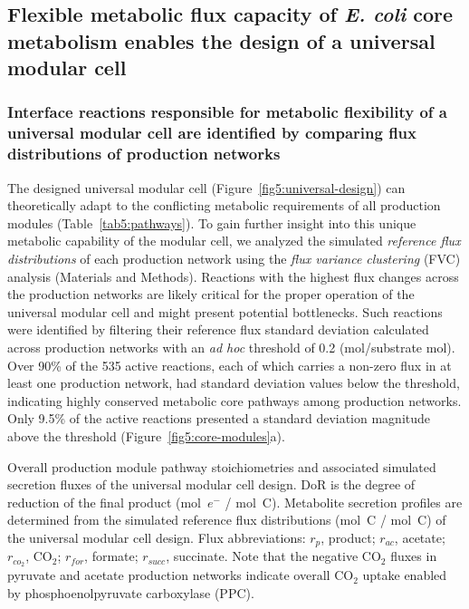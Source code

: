 \subsection{Flexible metabolic flux capacity of \textit{E. coli} core metabolism enables the design of a universal modular cell}

\subsubsection{Interface reactions responsible for metabolic flexibility of a universal modular cell are identified by comparing flux distributions of production networks}
The designed universal modular cell (Figure~\ref{fig5:universal-design}) can theoretically adapt to the conflicting metabolic requirements of all production modules (Table~\ref{tab5:pathways}).
To gain further insight into this unique metabolic capability of the modular cell, we analyzed the simulated \emph{reference flux distributions} of each production network using the \emph{flux variance clustering} (FVC) analysis (Materials and Methods).
Reactions with the highest flux changes across the production networks are likely critical for the proper operation of the universal modular cell and might present potential bottlenecks.
Such reactions were identified by filtering their reference flux standard deviation calculated across production networks with an \textit{ad hoc} threshold of 0.2 (mol/substrate mol).
Over 90\% of the 535 active reactions, each of which carries a non-zero flux in at least one production network, had standard deviation values below the threshold, indicating  highly conserved metabolic core pathways among production networks. Only 9.5\% of the active reactions presented a standard deviation magnitude above the threshold (Figure~\ref{fig5:core-modules}a).


\begin{table}[ht]
    \caption[Overall production module pathway stoichiometries and associated simulated secretion fluxes of the universal modular cell design]{Overall production module pathway stoichiometries and associated simulated secretion fluxes of the universal modular cell design.
    DoR is the degree of reduction of the final product (mol~$e^-$ / mol~C). Metabolite secretion profiles are determined from the simulated reference flux distributions (mol~C / mol~C) of the universal modular cell design.
    Flux abbreviations: $r_{p}$, product; $r_{ac}$, acetate; $r_{co_2}$, CO$_2$; $r_{for}$, formate; $r_{succ}$, succinate.
    Note that the negative CO$_2$ fluxes in pyruvate and acetate production networks indicate overall CO$_2$ uptake enabled by phosphoenolpyruvate carboxylase (PPC).}
    \centering
 	
    \label{tab5:pathways}
\end{table}

